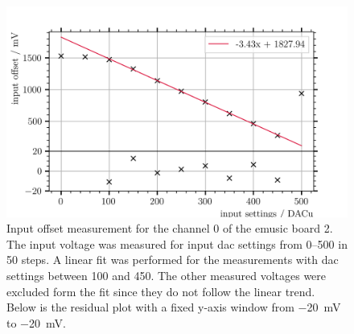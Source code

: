 \begin{figure}
	\centering
	\includegraphics[width=1.\textwidth]{pictures/input_offset_board_2_channel_0}
	\caption[Input offset measurement for eMUSIC board 2 channel 1]{Input offset measurement for the channel 0 of the \ac{emusic} board 2. The input voltage was measured for input \ac{dac} settings from \SIrange{0}{500}{\dacu} in \SI{50}{\dacu} steps. A linear fit was performed for the measurements with \ac{dac} settings between \SI{100}{\dacu} and \SI{450}{\dacu}. The other measured voltages were excluded form the fit since they do not follow the linear trend. Below is the residual plot with a fixed y-axis window from \SI{-20}{\milli\volt} to \SI{-20}{\milli\volt}.}
	\label{fig:input_offset_b2_ch0}
\end{figure}
